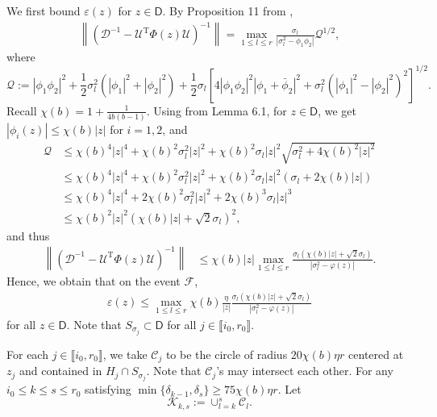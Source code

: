 \documentclass[reqno]{amsart}
\newcommand{\eps}{\varepsilon}
\newcommand{\T}{\mathrm{T}}
\theoremstyle{plain}
\theoremstyle{definition}
\begin{document}
We first bound $\eps(z)$ for $z\in \mathsf D$. By Proposition 11 from \cite{OVW22}, 
\begin{align*}
\left \| \left( \mathcal D^{-1} - \mathcal U^\T \Phi(z) \mathcal U \right)^{-1} \right \|= \max_{1\le l \le r} \frac{\sigma_l}{|\sigma_l^2 - \phi_1 \phi_2|} \mathcal Q^{1/2},
\end{align*}
where $$\mathcal Q:=|\phi_1 \phi_2|^2 + \frac{1}{2}\sigma_l^2 (|\phi_1|^2 + |\phi_2|^2) + \frac{1}{2}\sigma_l \left[ 4 |\phi_1 \phi_2|^2 |\phi_1 + \bar{\phi}_2|^2 + \sigma_l^2(|\phi_1|^2 - |\phi_2|^2)^2\right]^{1/2}.$$
Recall $\chi(b)=1+\frac{1}{4b(b-1)}.$ Using \cite[Eq. (31)]{Wang24} from Lemma 6.1, for $z\in \mathsf D$, we get $|\phi_i(z)|\le \chi(b) |z|$ for $i=1,2$, and 
\begin{align*}
\mathcal Q &\le \chi(b)^4 |z|^4 + \chi(b)^2 \sigma_l^2 |z|^2 + \chi(b)^2\sigma_l  |z|^2 \sqrt{\sigma_l^2 +4\chi(b)^2|z|^2 }\\
&\le \chi(b)^4 |z|^4 + \chi(b)^2 \sigma_l^2 |z|^2 + \chi(b)^2\sigma_l  |z|^2 (\sigma_l + 2\chi(b) |z|)\\
&\le \chi(b)^4 |z|^4 + 2 \chi(b)^2 \sigma_l^2 |z|^2 + 2 \chi(b)^3\sigma_l  |z|^3\\
&\le \chi(b)^2|z|^2\left(\chi(b) |z|+\sqrt{2}\sigma_l\right)^2, 
\end{align*}
and thus
\begin{align*}
\left \| \left( \mathcal D^{-1} - \mathcal U^\T \Phi(z) \mathcal U \right)^{-1} \right \| %
&\le \chi(b) |z| \max_{1\le l \le r}  \frac{\sigma_l (\chi(b) |z|+\sqrt{2}\sigma_l)}{|\sigma_l^2 - \varphi(z)|}.
\end{align*}
Hence, we obtain that on the event $\mathcal F$, 
\begin{align}\label{eq:epsbd1}
\eps(z) \le\max_{1\le l \le r} \chi(b)\frac{\eta}{|z|}\frac{\sigma_l (\chi(b) |z|+\sqrt{2}\sigma_l)}{|\sigma_l^2 - \varphi(z)|}
\end{align}
for all $z \in \mathsf D$. Note that $S_{\sigma_j} \subset \mathsf D$ for all $j \in \llbracket i_0, r_0 \rrbracket$.

For each $j \in \llbracket i_0, r_0 \rrbracket$, we take $\mathcal{C}_j$ to be the circle of radius $20\chi(b)\eta r$ centered at $z_j$ and contained in $H_j \cap S_{\sigma_j}$. Note that $\mathcal{C}_j$'s may intersect each other. For any $i_0 \le k\le s \le r_0$ satisfying $\min\{\delta_{k-1},\delta_s \} \ge 75 \chi(b) \eta r$. Let $$\mathcal K_{k,s}:=\cup_{l=k}^{s} \mathcal{C}_l.$$ 
\end{document}

